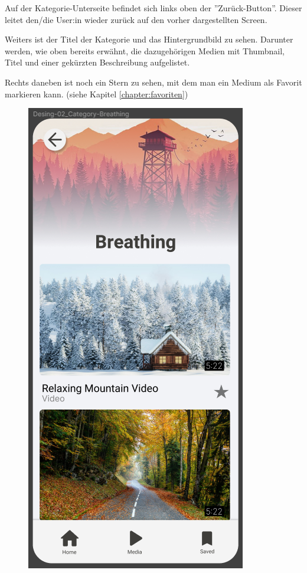 \newpage

Auf der Kategorie-Unterseite befindet sich links oben der ''Zurück-Button''. Dieser leitet den/die User:in wieder 
zurück auf den vorher dargestellten Screen.

Weiters ist der Titel der Kategorie und das Hintergrundbild zu sehen. Darunter werden, wie oben bereits erwähnt, die
dazugehörigen Medien mit Thumbnail, Titel und einer gekürzten Beschreibung aufgelistet.

Rechts daneben ist noch ein 
Stern zu sehen, mit dem man ein Medium als Favorit markieren kann. (siehe Kapitel \ref{chapter:favoriten})

\begin{figure}[H]
    \begin{minipage}{0.5\textwidth}
        \centering
        \includegraphics[height=2\textwidth]{./pics/pKategorie.png}

\end{minipage}
\end{figure}
